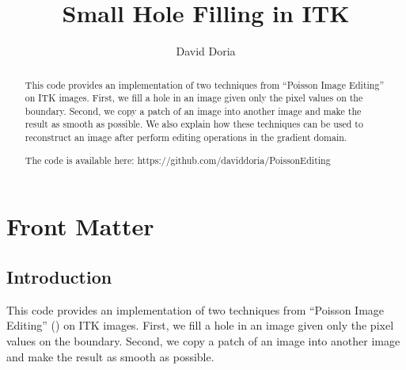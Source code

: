 \documentclass{InsightArticle}
\title{Small Hole Filling in ITK}
\author{David Doria}
\newcommand{\IJhandlerIDnumber}{3257}
\begin{document}
%
% 
\IJhandlefooter{\IJhandlerIDnumber}


\ifpdf
\else
\fi


\maketitle


\ifhtml
\chapter*{Front Matter\label{front}}
\fi


\begin{abstract}
\noindent
This code provides an implementation of two techniques from ``Poisson Image Editing'' on ITK images. First, we fill a hole in an image given only the pixel values on the boundary. Second, we copy a patch of an image into another image and make the result as smooth as possible. We also explain how these techniques can be used to reconstruct an image after perform editing operations in the gradient domain.

The code is available here: https://github.com/daviddoria/PoissonEditing

\end{abstract}

\IJhandlenote{\IJhandlerIDnumber}

\tableofcontents

\section{Introduction}
This code provides an implementation of two techniques from ``Poisson Image Editing'' (\cite{PoissonImageEditing}) on ITK images. First, we fill a hole in an image given only the pixel values on the boundary. Second, we copy a patch of an image into another image and make the result as smooth as possible. 
\end{document}
